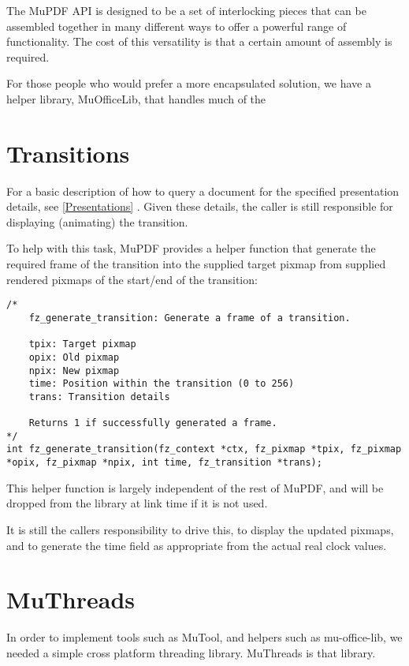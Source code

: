 \documentclass[oneside]{book}
\newcommand{\rjwref}[1] {\autoref{#1} \nameref{#1}}
\begin{document}
The MuPDF API is designed to be a set of interlocking pieces that can be assembled together in many different ways to offer a powerful range of functionality. The cost of this versatility is that a certain amount of assembly is required.

For those people who would prefer a more encapsulated solution, we have a helper library, MuOfficeLib, that handles much of the

\chapter{Transitions}
\label{Transitions}

For a basic description of how to query a document for the specified presentation details, see \rjwref{Presentations}. Given these details, the caller is still responsible for displaying (animating) the transition.

To help with this task, MuPDF provides a helper function that generate the required frame of the transition into the supplied target pixmap from supplied rendered pixmaps of the start/end of the transition:

\begin{lstlisting}
/*
	fz_generate_transition: Generate a frame of a transition.

	tpix: Target pixmap
	opix: Old pixmap
	npix: New pixmap
	time: Position within the transition (0 to 256)
	trans: Transition details

	Returns 1 if successfully generated a frame.
*/
int fz_generate_transition(fz_context *ctx, fz_pixmap *tpix, fz_pixmap *opix, fz_pixmap *npix, int time, fz_transition *trans);
\end{lstlisting}

This helper function is largely independent of the rest of MuPDF, and will be dropped from the library at link time if it is not used.

It is still the callers responsibility to drive this, to display the updated pixmaps, and to generate the time field as appropriate from the actual real clock values.

\chapter{MuThreads}

In order to implement tools such as MuTool, and helpers such as mu-office-lib, we needed a simple cross platform threading library. MuThreads is that library.
\end{document}
